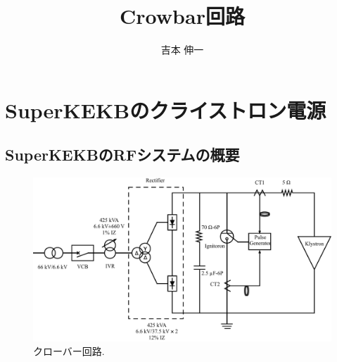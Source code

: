 \documentclass[book,openany]{jlreq}
\theoremstyle{definition}
\begin{document}
\title{Crowbar回路}
\author{吉本 伸一}
\maketitle
\tableofcontents

\chapter{SuperKEKBのクライストロン電源}
\section{SuperKEKBのRFシステムの概要}

%
\begin{figure}[htbp]
  \begin{center}
    \includegraphics[width=12cm]{figs/Crowbar_Circuit.pdf}
    \caption{クローバー回路.}
    \label{fig:CrowbarCircuit}
  \end{center}
\end{figure}
\end{document}
